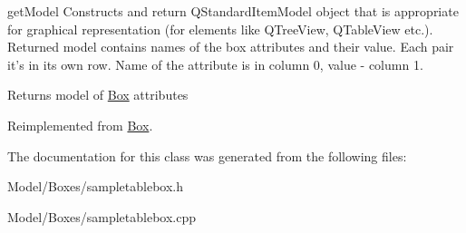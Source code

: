 get\-Model Constructs and return Q\-Standard\-Item\-Model object that is appropriate for graphical representation (for elements like Q\-Tree\-View, Q\-Table\-View etc.). Returned model contains names of the box attributes and their value. Each pair it's in its own row. Name of the attribute is in column 0, value -\/ column 1. 

\begin{DoxyReturn}{Returns}
model of \hyperlink{class_box}{Box} attributes 
\end{DoxyReturn}


Reimplemented from \hyperlink{class_box_a5c7911f3c88eec77383c0a464979807d}{Box}.



The documentation for this class was generated from the following files\-:\begin{DoxyCompactItemize}
\item 
Model/\-Boxes/sampletablebox.\-h\item 
Model/\-Boxes/sampletablebox.\-cpp\end{DoxyCompactItemize}
